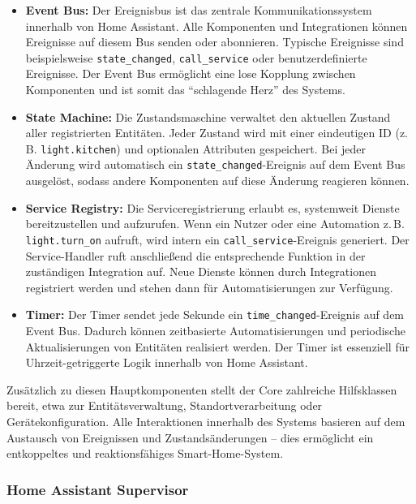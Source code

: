 \begin{itemize}
  \item \textbf{Event Bus:} Der Ereignisbus ist das zentrale Kommunikationssystem innerhalb von Home Assistant. Alle Komponenten und Integrationen können Ereignisse auf diesem Bus senden oder abonnieren. Typische Ereignisse sind beispielsweise \texttt{state\_changed}, \texttt{call\_service} oder benutzerdefinierte Ereignisse. Der Event Bus ermöglicht eine lose Kopplung zwischen Komponenten und ist somit das ``schlagende Herz'' des Systems.\\

  \item \textbf{State Machine:} Die Zustandsmaschine verwaltet den aktuellen Zustand aller registrierten Entitäten. Jeder Zustand wird mit einer eindeutigen ID (z.\,B. \texttt{light.kitchen}) und optionalen Attributen gespeichert. Bei jeder Änderung wird automatisch ein \texttt{state\_changed}-Ereignis auf dem Event Bus ausgelöst, sodass andere Komponenten auf diese Änderung reagieren können.\\

  \item \textbf{Service Registry:} Die Serviceregistrierung erlaubt es, systemweit Dienste bereitzustellen und aufzurufen. Wenn ein Nutzer oder eine Automation z.\,B. \texttt{light.turn\_on} aufruft, wird intern ein \texttt{call\_service}-Ereignis generiert. Der Service-Handler ruft anschließend die entsprechende Funktion in der zuständigen Integration auf. Neue Dienste können durch Integrationen registriert werden und stehen dann für Automatisierungen zur Verfügung.\\

  \item \textbf{Timer:} Der Timer sendet jede Sekunde ein \texttt{time\_changed}-Ereignis auf dem Event Bus. Dadurch können zeitbasierte Automatisierungen und periodische Aktualisierungen von Entitäten realisiert werden. Der Timer ist essenziell für Uhrzeit-getriggerte Logik innerhalb von Home Assistant.
\end{itemize}

\noindent
Zusätzlich zu diesen Hauptkomponenten stellt der Core zahlreiche Hilfsklassen bereit, etwa zur Entitätsverwaltung, Standortverarbeitung oder Gerätekonfiguration. Alle Interaktionen innerhalb des Systems basieren auf dem Austausch von Ereignissen und Zustandsänderungen – dies ermöglicht ein entkoppeltes und reaktionsfähiges Smart-Home-System.

\subsubsection{Home Assistant Supervisor}

